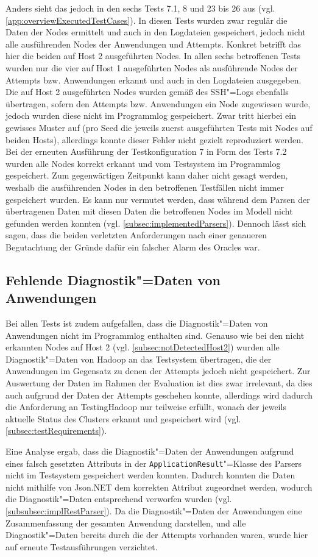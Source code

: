 Anders sieht das jedoch in den sechs Tests 7.1, 8 und 23 bis 26 aus (vgl. \cref{app:overviewExecutedTestCases}).
In diesen Tests wurden zwar regulär die Daten der Nodes ermittelt und auch in den Logdateien gespeichert, jedoch nicht alle ausführenden Nodes der Anwendungen und Attempts.
Konkret betrifft das hier die beiden auf Host 2 ausgeführten Nodes.
In allen sechs betroffenen Tests wurden nur die vier auf Host 1 ausgeführten Nodes als ausführende Nodes der Attempts bzw. Anwendungen erkannt und auch in den Logdateien ausgegeben.
Die auf Host 2 ausgeführten Nodes wurden gemäß des SSH"=Logs ebenfalls übertragen, sofern den Attempts bzw. Anwendungen ein Node zugewiesen wurde, jedoch wurden diese nicht im Programmlog gespeichert.
Zwar tritt hierbei ein gewisses Muster auf (pro Seed die jeweils zuerst ausgeführten Tests mit Nodes auf beiden Hosts), allerdings konnte dieser Fehler nicht gezielt reproduziert werden.
Bei der erneuten Ausführung der Testkonfiguration 7 in Form des Tests 7.2 wurden alle Nodes korrekt erkannt und vom Testsystem im Programmlog gespeichert.
Zum gegenwärtigen Zeitpunkt kann daher nicht gesagt werden, weshalb die ausführenden Nodes in den betroffenen Testfällen nicht immer gespeichert wurden.
Es kann nur vermutet werden, dass während dem Parsen der übertragenen Daten mit diesen Daten die betroffenen Nodes im Modell nicht gefunden werden konnten (vgl. \cref{subsec:implementedParsers}).
Dennoch lässt sich sagen, dass die beiden verletzten Anforderungen nach einer genaueren Begutachtung der Gründe dafür ein falscher Alarm des Oracles war.

\subsection{Fehlende Diagnostik"=Daten von Anwendungen}
\label{subsec:notSavedAppDiagnostics}

Bei allen Tests ist zudem aufgefallen, dass die Diagnostik"=Daten von Anwendungen nicht im Programmlog enthalten sind.
Genauso wie bei den nicht erkannten Nodes auf Host 2 (vgl. \cref{subsec:notDetectedHost2}) wurden alle Diagnostik"=Daten von Hadoop an das Testsystem übertragen, die der Anwendungen im Gegensatz zu denen der Attempts jedoch nicht gespeichert.
Zur Auswertung der Daten im Rahmen der Evaluation ist dies zwar irrelevant, da dies auch aufgrund der Daten der Attempts geschehen konnte, allerdings wird dadurch die Anforderung an TestingHadoop nur teilweise erfüllt, wonach der jeweils aktuelle Status des Clusters erkannt und gespeichert wird (vgl. \cref{subsec:testRequirements}).

Eine Analyse ergab, dass die Diagnostik"=Daten der Anwendungen aufgrund eines falsch gesetzten Attributs in der \texttt{ApplicationResult}"=Klasse des Parsers nicht im Testsystem gespeichert werden konnten.
Dadurch konnten die Daten nicht mithilfe von Json.NET dem korrekten Attribut zugeordnet werden, wodurch die Diagnostik"=Daten entsprechend verworfen wurden (vgl. \cref{subsubsec:implRestParser}).
Da die Diagnostik"=Daten der Anwendungen eine Zusammenfassung der gesamten Anwendung darstellen, und alle Diagnostik"=Daten bereits durch die der Attempts vorhanden waren, wurde hier auf erneute Testausführungen verzichtet.

